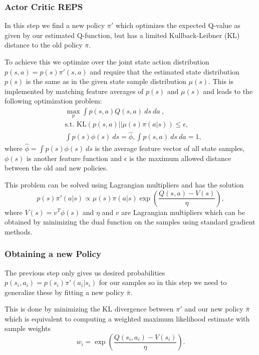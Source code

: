 \documentclass[twoside]{article}
\begin{document}
\subsubsection{Actor Critic REPS}
\label{sec:reps}

In this step we find a new policy $\pi'$ which optimizes the expected Q-value
as given by our estimated Q-function, but has a limited Kullback-Leibner (KL)
distance to the old policy $\pi$.

To achieve this we optimize over the joint state action distribution
$p(s,a) = p(s) \pi'(s, a)$ and require that the estimated state distribution
$p(s)$ is the same as in the given state sample distribution $\mu(s)$.
This is implemented by matching feature averages of $p(s)$ and $\mu(s)$ and
leads to the following optimization problem:
\begin{align*}
    & \max_p \int p(s, a)Q(s, a)\:ds\:da\:, \\
    & \text{s.t. } \text{KL}(p(s, a) || \mu(s)\pi(a|s)) \leq \epsilon,\\
    & \int p(s)\phi(s)\:ds = \hat{\phi}, \int p(s, a)\:ds\:da = 1,
\end{align*}
where $\hat{\phi} = \int p(s) \phi(s)\:ds$ is the average feature vector of all
state samples, $\phi(s)$ is another feature function and $\epsilon$ is the
maximum allowed distance between the old and new policies.

This problem can be solved using Lagrangian multipliers and has the solution
$$
p(s)\pi'(a|s) \propto \mu(s) \pi(a|s) \exp\left(\frac{Q(s,a) - V(s)}{\eta}\right),
$$
where $V(s) = v^T \phi(s)$ and $\eta$ and $v$ are Lagrangian multipliers which
can be obtained by minimizing the dual function on the samples using standard
gradient methods.

\subsubsection{Obtaining a new Policy}
\label{sec:gp}

The previous step only gives us desired probabilities
$p(s_i, a_i) = p(s_i) \pi'(a_i|s_i)$ for our samples so in this step we need
to generalize these by fitting a new policy $\bar{\pi}$.

This is done by minimizing the KL divergence between $\pi'$ and our new policy
$\bar{\pi}$ which is equivalent to computing a weighted maximum likelihood
estimate with sample weights
$$ w_i = \exp\left(\frac{Q(s_i, a_i) - V(s_i)}{\eta}\right). $$
\end{document}
